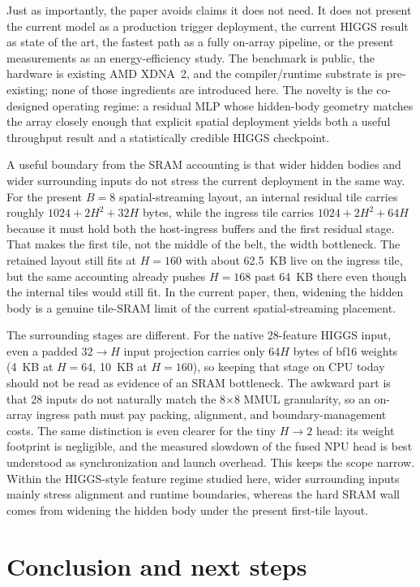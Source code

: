 \documentclass[a4paper,11pt]{article}
\begin{document}
Just as importantly, the paper avoids claims it does not need. It does not
present the current model as a production trigger deployment, the current HIGGS
result as state of the art, the fastest path as a fully on-array pipeline, or
the present measurements as an energy-efficiency study. The benchmark is
public, the hardware is existing AMD XDNA~2, and the compiler/runtime substrate
is pre-existing; none of those ingredients are introduced here. The novelty is
the co-designed operating regime: a residual MLP whose hidden-body geometry
matches the array closely enough that explicit spatial deployment yields both a
useful throughput result and a statistically credible HIGGS checkpoint.

A useful boundary from the SRAM accounting is that wider hidden bodies and
wider surrounding inputs do not stress the current deployment in the same way.
For the present $B=8$ spatial-streaming layout, an internal residual tile carries
roughly $1024 + 2H^2 + 32H$ bytes, while the ingress tile carries
$1024 + 2H^2 + 64H$ because it must hold both the host-ingress buffers and the
first residual stage. That makes the first tile, not the middle of the belt,
the width bottleneck. The retained layout still fits at $H=160$ with about
62.5~KB live on the ingress tile, but the same accounting already pushes
$H=168$ past 64~KB there even though the internal tiles would still fit. In the
current paper, then, widening the hidden body is a genuine tile-SRAM limit of
the current spatial-streaming placement.

The surrounding stages are different. For the native 28-feature HIGGS input,
even a padded $32 \rightarrow H$ input projection carries only $64H$ bytes of
bf16 weights (4~KB at $H=64$, 10~KB at $H=160$), so keeping that stage on CPU
today should not be read as evidence of an SRAM bottleneck. The awkward
part is that 28 inputs do not naturally match the 8$\times$8 MMUL granularity,
so an on-array ingress path must pay packing, alignment, and boundary-management
costs. The same distinction is even clearer for the tiny $H \rightarrow 2$
head: its weight footprint is negligible, and the measured slowdown of the
fused NPU head is best understood as synchronization and launch overhead. This
keeps the scope narrow. Within the HIGGS-style feature regime studied here,
wider surrounding inputs mainly stress alignment and runtime boundaries,
whereas the hard SRAM wall comes from widening the hidden body under the
present first-tile layout.

\section{Conclusion and next steps}
\end{document}
